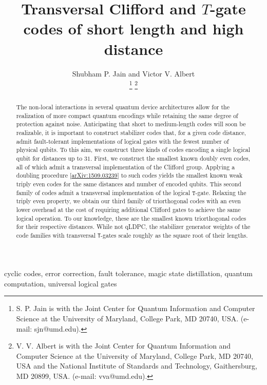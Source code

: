 \documentclass[journal]{IEEEtran}
\newcommand{\T}{\texttt{T}}
\begin{document}
\title{Transversal Clifford and $T$-gate codes of short length and high distance}
\author{Shubham P. Jain\IEEEmembership{} and Victor V. Albert \IEEEmembership{}

\thanks{S. P. Jain is with the Joint Center for Quantum Information and Computer Science at the University of Maryland, College Park, MD 20740, USA. (e-mail: sjn@umd.edu).}
\thanks{V. V. Albert is with the Joint Center for Quantum Information and Computer Science at the University of Maryland, College Park, MD 20740, USA and the National Institute of Standards and Technology, Gaithersburg, MD 20899, USA. (e-mail: vva@umd.edu).}}

\maketitle

\begin{abstract}

The non-local interactions in several quantum device architectures allow for the realization of more compact quantum encodings while retaining the same degree of protection against noise. Anticipating that short to medium-length codes will soon be realizable, it is important to construct stabilizer codes that, for a given code distance, admit fault-tolerant implementations of logical gates with the fewest number of physical qubits. 
To this aim, we construct three kinds of codes encoding a single logical qubit for distances up to $31$. First, we construct the smallest known doubly even codes, all of which admit a transversal implementation of the Clifford group. Applying a doubling procedure  [\href{https://arxiv.org/abs/1509.03239}{arXiv:1509.03239}] to such codes yields the smallest known weak triply even codes for the same distances and number of encoded qubits. This second family of codes admit a transversal implementation of the logical $\texttt{T}$-gate. Relaxing the triply even property, we obtain our third family of triorthogonal codes with an even lower overhead at the cost of requiring additional Clifford gates to achieve the same logical operation. 
To our knowledge, these are the smallest known triorthogonal codes for their respective distances. While not qLDPC, the stabilizer generator weights of the code families with transversal \T-gates scale roughly as the square root of their lengths.

\end{abstract}

\begin{IEEEkeywords}
cyclic codes, error correction, fault tolerance,  magic state distillation, quantum computation, universal logical gates
\end{IEEEkeywords}
\end{document}
